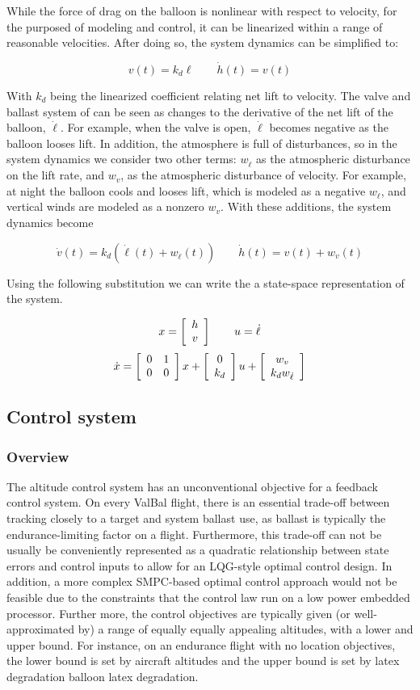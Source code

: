 \documentclass[11pt]{scrartcl} %
\begin{document}
While the force of drag on the balloon is nonlinear with respect to velocity, for the purposed of modeling and control, it can be linearized within a range of reasonable velocities. After doing so, the system dynamics can be simplified to:

\[ v(t) = k_d \ell \qquad \dot h(t) = v(t)\]

With $k_d$ being the linearized coefficient relating net lift to velocity. The valve and ballast system of can be seen as changes to the derivative of the net lift of the balloon, $\dot \ell$. For example, when the valve is open, $\dot \ell$ becomes negative as the balloon looses lift. In addition, the atmosphere is full of disturbances, so in the system dynamics we consider two other terms: $w_{\dot \ell}$ as the atmospheric disturbance on the lift rate, and $w_v$, as the atmospheric disturbance of velocity. For example, at night the balloon cools and looses lift, which is modeled as a negative $w_{\dot \ell}$, and vertical winds are modeled as a nonzero $w_v$. With these additions, the system dynamics become

\[ \dot v(t) = k_d(\dot \ell(t) + w_{\dot \ell}(t)) \qquad \dot h(t) = v(t) + w_v(t) \]

Using the following substitution we can write the a state-space representation of the system. 

\[x = \mx{c}{h \\ v} \qquad u = \dot \ell\]
\[\dot x = \mx{cc}{0 & 1 \\ 0 & 0}x + \mx{cc}{0 \\ k_d} u + \mx{c}{w_v \\ k_d w_{\dot \ell}}\]

\subsection{Control system}
\subsubsection{Overview}
The altitude control system has an unconventional objective for a feedback control system. On every ValBal flight, there is an essential trade-off between tracking closely to a target and system ballast use, as ballast is typically the endurance-limiting factor on a flight. Furthermore, this trade-off can not be usually be conveniently represented as a quadratic relationship between state errors and control inputs to allow for an LQG-style optimal control design. In addition, a more complex SMPC-based optimal control approach would not be feasible due to the constraints that the control law run on a low power embedded processor. Further more, the control objectives are typically given (or well-approximated by) a range of equally equally appealing altitudes, with a lower and upper bound. For instance, on an endurance flight with no location objectives, the lower bound is set by aircraft altitudes and the upper bound is set by latex degradation balloon latex degradation. 
\end{document}
